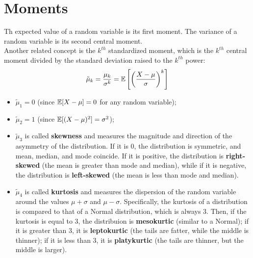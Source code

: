 \section*{Moments}

Th expected value of a random variable is its first moment.
The variance of a random variable is its second central moment. \\
Another related concept is the $k^{th}$ standardized moment, which is the $k^{th}$ central moment divided by the standard deviation raised to the $k^{th}$ power:
\begin{equation*}
    \tilde{\mu}_k = \frac{\mu_k}{\sigma^k} = \mathbb{E}\left[\left(\frac{X-\mu}{\sigma}\right)^k\right]
\end{equation*}
\begin{itemize}
    \item $\tilde{\mu}_1 = 0$ (since $\mathbb{E}[X - \mu] = 0$ for any random variable);
    \item $\tilde{\mu}_2 = 1$ (since $\mathbb{E}[(X - \mu)^2] = \sigma^2$);
    \item $\tilde{\mu}_3$ is called \textbf{skewness} and measures the magnitude and direction of the asymmetry of the distribution. If it is 0, the distribution is symmetric, and mean, median, and mode coincide. If it is positive, the distribution is \textbf{right-skewed} (the mean is greater than mode and median), while if it is negative, the distribution is \textbf{left-skewed} (the mean is less than mode and median).
    \item $\tilde{\mu}_4$ is called \textbf{kurtosis} and measures the dispersion of the random variable around the values $\mu+\sigma$ and $\mu - \sigma$. Specifically, the kurtosis of a distribution is compared to that of a Normal distribution, which is always 3. Then, if the kurtosis is equal to 3, the distribuion is \textbf{mesokurtic} (similar to a Normal); if it is greater than 3, it is \textbf{leptokurtic} (the tails are fatter, while the middle is thinner); if it is less than 3, it is \textbf{platykurtic} (the tails are thinner, but the middle is larger).
\end{itemize}